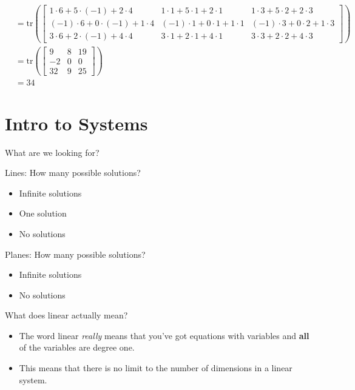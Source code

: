 \documentclass[
  letterpaper,
  DIV=11,
  numbers=noendperiod]{scrartcl}
\providecommand{\tightlist}{%
  \setlength{\itemsep}{0pt}\setlength{\parskip}{0pt}}\usepackage{longtable,booktabs,array}
\begin{document}
\begin{enumerate}
\begin{align*}
  &= \mathrm{tr}\left(\begin{bmatrix}1 \cdot 6 + 5 \cdot (-1) + 2 \cdot 4 & 1 \cdot 1 + 5 \cdot 1 + 2 \cdot 1 & 1 \cdot 3 + 5 \cdot 2 + 2 \cdot 3 \\ (-1) \cdot 6 + 0 \cdot (-1) + 1 \cdot 4 & (-1) \cdot 1 + 0 \cdot 1 + 1 \cdot 1 & (-1) \cdot 3 + 0 \cdot 2 + 1 \cdot 3 \\ 3 \cdot 6 + 2 \cdot (-1) + 4 \cdot 4 & 3 \cdot 1 + 2 \cdot 1 + 4 \cdot 1 & 3 \cdot 3 + 2 \cdot 2 + 4 \cdot 3 \end{bmatrix}\right) \\
  &= \mathrm{tr}\left(\begin{bmatrix} 9 & 8 & 19 \\ -2 & 0 & 0 \\ 32 & 9 & 25 \end{bmatrix}\right) \\
  &= 34
  \end{align*}
\end{enumerate}

\section{Intro to Systems}\label{intro-to-systems}

What are we looking for?

Lines: How many possible solutions?

\begin{itemize}
\tightlist
\item
  Infinite solutions
\item
  One solution
\item
  No solutions
\end{itemize}

Planes: How many possible solutions?

\begin{itemize}
\tightlist
\item
  Infinite solutions
\item
  No solutions
\end{itemize}

What does linear actually mean?

\begin{itemize}
\tightlist
\item
  The word linear \emph{really} means that you've got equations with
  variables and \textbf{all} of the variables are degree one.
\item
  This means that there is no limit to the number of dimensions in a
  linear system.
\end{itemize}
\end{document}
